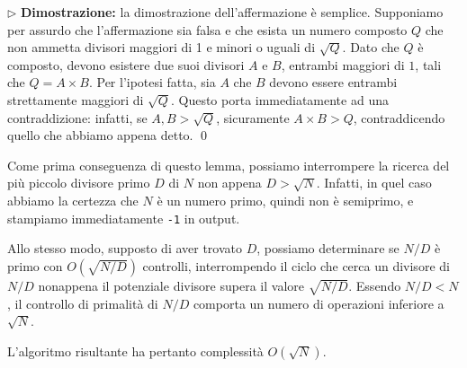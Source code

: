 $\triangleright$ \textbf{Dimostrazione:} {la dimostrazione dell'affermazione è semplice. Supponiamo per assurdo che l'affermazione sia falsa e che esista un numero composto $Q$ che non ammetta divisori maggiori di 1 e minori o uguali di $\sqrt{Q}$. Dato che $Q$ è composto, devono esistere due suoi divisori $A$ e $B$, entrambi maggiori di $1$, tali che $Q = A\times B$. Per l'ipotesi fatta, sia $A$ che $B$ devono essere entrambi strettamente maggiori di $\sqrt{Q}$. Questo porta immediatamente ad una contraddizione: infatti, se $A, B > \sqrt{Q}$, sicuramente $A\times B > Q$, contraddicendo quello che abbiamo appena detto. \qed}

Come prima conseguenza di questo lemma, possiamo interrompere la ricerca del più piccolo divisore primo $D$ di $N$ non appena $D > \sqrt{N}$. Infatti, in quel caso abbiamo la certezza che $N$ è un numero primo, quindi non è semiprimo, e stampiamo immediatamente \texttt{-1} in output.

Allo stesso modo, supposto di aver trovato $D$, possiamo determinare se $N/D$ è primo con $O(\sqrt{N/D})$ controlli, interrompendo il ciclo che cerca un divisore di $N/D$ nonappena il potenziale divisore supera il valore $\sqrt{N/D}$. Essendo $N/D < N$, il controllo di primalità di $N/D$ comporta un numero di operazioni inferiore a $\sqrt{N}$.

L'algoritmo risultante ha pertanto complessità $O(\sqrt{N})$.


\Codice
\SolN
\colorbox{white}{}

\SolSqrtN
\colorbox{white}{}\vspace{-20mm}
